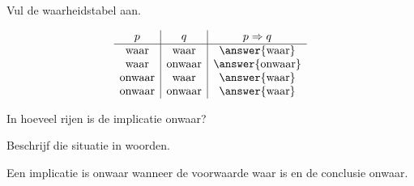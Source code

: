 \documentclass{ximera}
\begin{document}

\begin{oefening}[Waarheidstabel]{\oefB\ESS}

Vul de waarheidstabel aan.

\[
\begin{array}{c|c|c}
p&q&p\Rightarrow q\\
\hline
\text{waar}&\text{waar}&\answer{\text{waar}}\\
\text{waar}&\text{onwaar}&\answer{\text{onwaar}}\\
\text{onwaar}&\text{waar}&\answer{\text{waar}}\\
\text{onwaar}&\text{onwaar}&\answer{\text{waar}}
\end{array}
\]

\begin{question}

In hoeveel rijen is de implicatie onwaar?

\begin{multipleChoice}





\end{multipleChoice}

\end{question}


\begin{question}

Beschrijf die situatie in woorden.

\begin{oplossing}

Een implicatie is onwaar wanneer de voorwaarde waar is en de conclusie
onwaar.

\end{oplossing}

\end{question}

\end{oefening}


\end{document}
